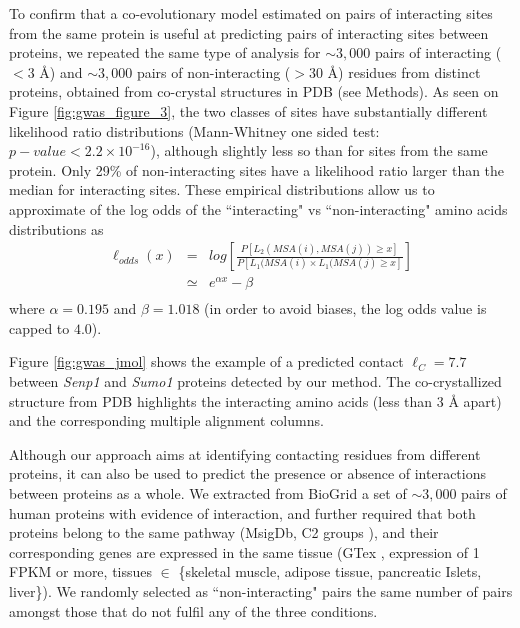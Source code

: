 To confirm that a co-evolutionary model estimated on pairs of interacting sites from the same protein is useful at predicting pairs of interacting sites between proteins, we repeated the same type of analysis for $\sim3,000$ pairs of interacting ($< 3$ \r{A}) and $\sim3,000$ pairs of non-interacting ($>30$ \r{A}) residues from distinct proteins, obtained from co-crystal structures in PDB (see Methods). 
As seen on Figure \ref{fig:gwas_figure_3}, the two classes of sites have substantially different likelihood ratio distributions (Mann-Whitney one sided test: $p-value < 2.2 \times 10^{-16}$), although slightly less so than for sites from the same protein. Only 29\% of non-interacting sites have a likelihood ratio larger than the median for interacting sites. 
These empirical distributions allow us to approximate of the log odds of the ``interacting" vs ``non-interacting" amino acids distributions as
\begin{eqnarray*}
\ell_{odds}(x) & = & log\left[ \frac{P[ L_2(MSA(i), MSA(j)) \ge x ]}{P[ L_1(MSA(i) \times L_1(MSA(j) \ge x]} \right] \\
    & \simeq &e^{\alpha x}- \beta \\
\end{eqnarray*}
\noindent where $\alpha = 0.195$ and $\beta = 1.018$ (in order to avoid biases, the log odds value is capped to $4.0$).


Figure \ref{fig:gwas_jmol} shows the example of a predicted contact $\ell_C = 7.7$ between \textit{Senp1} and \textit{Sumo1} proteins detected by our method. The co-crystallized structure from PDB highlights the interacting amino acids (less than $3$ \r{A} apart) and the corresponding multiple alignment columns.

Although our approach aims at identifying contacting residues from different proteins, it can also be used to predict the presence or absence of interactions between proteins as a whole. 
We extracted from BioGrid \cite{stark2006biogrid} a set of $\sim3,000$ pairs of human proteins with evidence of interaction, and further required that both proteins belong to the same pathway (MsigDb, C2 groups \cite{subramanian2005gene}), and their corresponding genes are expressed in the same tissue (GTex \cite{lonsdale2013genotype}, expression of 1 FPKM or more, tissues $\in$ \{skeletal muscle, adipose tissue, pancreatic Islets, liver\}). We randomly selected as ``non-interacting" pairs the same number of pairs amongst those that do not fulfil any of the three conditions.

